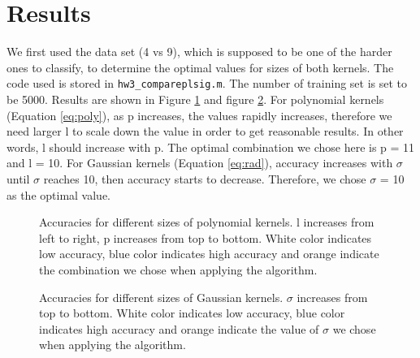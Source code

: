 \documentclass[UTF8,12pt]{article}
\begin{document}
	\section{Results}
	We first used the data set (4 vs 9), which is supposed to be one of the harder ones to classify, to determine the optimal values for sizes of both kernels. The code used is stored in \texttt{hw3\_compareplsig.m}. The number of training set is set to be 5000. Results are shown in Figure \ref{fig:pl} and figure \ref{fig:sig}. For polynomial kernels (Equation \ref{eq:poly}), as p increases, the values rapidly increases, therefore we need larger l to scale down the value in order to get reasonable results. In other words, l should increase with p. The optimal combination we chose here is p = 11 and l = 10. For Gaussian kernels (Equation \ref{eq:rad}), accuracy increases with $\sigma$ until $\sigma$ reaches 10, then accuracy starts to decrease. Therefore, we chose $\sigma$ = 10 as the optimal value.
	\begin{figure}[!ht]
		\centering
		\caption{\label{fig:pl}Accuracies for different sizes of polynomial kernels. l increases from left to right, p increases from top to bottom. White color indicates low accuracy, blue color indicates high accuracy and orange indicate the combination we chose when applying the algorithm.}
	\end{figure}
	\begin{figure}[!ht]
		\centering
		\caption{\label{fig:sig}Accuracies for different sizes of Gaussian kernels. $\sigma$ increases from top to bottom. White color indicates low accuracy, blue color indicates high accuracy and orange indicate the value of $\sigma$ we chose when applying the algorithm.}
	\end{figure}
	
\end{document}

